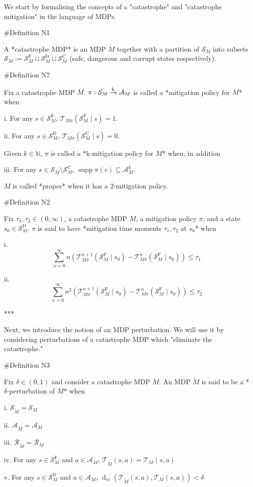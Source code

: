 \documentclass[a4paper]{article}
\DeclareMathOperator{\Supp}{supp}
\newcommand{\AP}[1]{\left(#1\right)}
\newcommand{\Dtva}[1]{\operatorname{d}_{\text{tv}}\AP{#1}}
\newcommand{\Nats}{\mathbb{N}}
\newcommand{\M}{\xrightarrow{\textnormal{k}}}
\newcommand{\A}{\mathcal{A}}
\newcommand{\St}{\mathcal{S}}
\newcommand{\T}{\mathcal{T}}
\newcommand{\R}{\mathcal{R}}
\newcommand{\SF}{\St^{\text{F}}}
\newcommand{\SD}{\St^{\text{D}}}
\newcommand{\SC}{\St^{\text{C}}}
\begin{document}
We start by formalising the concepts of a "catastrophe" and "catastrophe mitigation" in the language of MDPs.

\#Definition N1

A *catastrophe MDP* is an MDP $M$ together with a partition of $\St_M$ into subsets $\St_M:=\SF_M \sqcup \SD_M \sqcup \SC_M$ (safe, dangerous and corrupt states respectively). 

\#Definition N7

Fix a catastrophe MDP $M$. $\pi: \St_M \M \A_M$ is called a *mitigation policy for $M$* when

i. For any $s \in \SF_M$, $\T_{M\pi}\AP{\SF_M \mid s}=1$.

ii. For any $s \in \SD_M$, $\T_{M\pi}\AP{\SC_M \mid s}=0$.

Given $k \in \Nats$, $\pi$ is called a *k-mitigation policy for $M$* when, in addition

iii. For any $s \in \St_M \setminus \SC_M$, $\Supp{\pi(s)} \subseteq \A_M^k$.

$M$ is called *proper* when it has a 2-mitigation policy.

\#Definition N2

Fix $\tau_1,\tau_2 \in (0,\infty)$, a catastrophe MDP $M$, a mitigation policy $\pi$, and a state $s_0 \in \SD_M$. $\pi$ is said to have *mitigation time moments $\tau_1,\tau_2$ at $s_0$* when

i. $$\sum_{n=0}^\infty n \AP{\T_{M\pi}^{n+1}\AP{\SF_M \mid s_0}-\T_{M\pi}^{n}\AP{\SF_M \mid s_0}} \leq \tau_1$$

ii. $$\sum_{n=0}^\infty n^2 \AP{\T_{M\pi}^{n+1}\AP{\SF_M \mid s_0}-\T_{M\pi}^{n}\AP{\SF_M \mid s_0}} \leq \tau_2$$

***

Next, we introduce the notion of an MDP perturbation. We will use it by considering perturbations of a catastrophe MDP which "eliminate the catastrophe."

\#Definition N3

Fix $\delta\in(0,1)$ and consider a catastrophe MDP $M$. An MDP $\tilde{M}$ is said to be a *$\delta$-perturbation of $M$* when

i. $\St_{\tilde{M}} = \St_M$

ii. $\A_{\tilde{M}} = \A_M$

iii. $\R_{\tilde{M}}=\R_M$

iv. For any $s \in \SF_M$ and $a \in \A_M$, $\T_{\tilde{M}}\AP{s,a}=\T_{M}\AP{s,a}$

v. For any $s \in \SD_M$ and $a \in \A_M$, $\Dtva{\T_{\tilde{M}}\AP{s,a},\T_{M}\AP{s,a}} < \delta$
\end{document}
